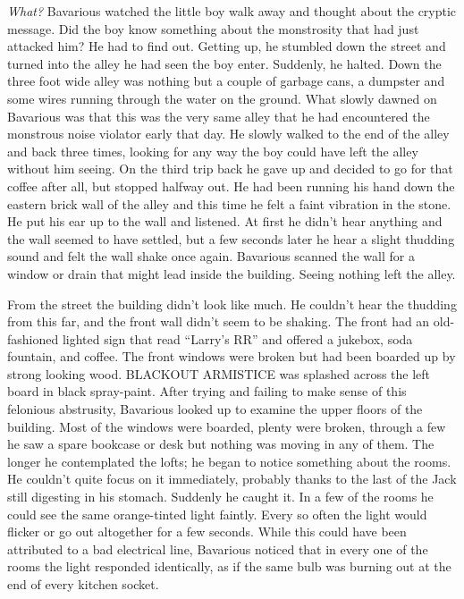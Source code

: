 {\em What?} Bavarious watched the little boy walk away and thought
about the cryptic message. Did the boy know something about the
monstrosity that had just attacked him? He had to find out. Getting
up, he stumbled down the street and turned into the alley he had
seen the boy enter. Suddenly, he halted. Down the three foot wide
alley was nothing but a couple of garbage cans, a dumpster and some
wires running through the water on the ground. What slowly dawned
on Bavarious was that this was the very same alley that he had
encountered the monstrous noise violator early that day. He slowly
walked to the end of the alley and back three times, looking for
any way the boy could have left the alley without him seeing. On
the third trip back he gave up and decided to go for that coffee
after all, but stopped halfway out. He had been running his hand
down the eastern brick wall of the alley and this time he felt a
faint vibration in the stone. He put his ear up to the wall and
listened. At first he didn't hear anything and the wall
seemed to have settled, but a few seconds later he hear a slight
thudding sound and felt the wall shake once again. Bavarious
scanned the wall for a window or drain that might lead inside the
building. Seeing nothing left the alley.



From the street the building didn't look like much. He
couldn't hear the thudding from this far, and the front wall
didn't seem to be shaking. The front had an old-fashioned
lighted sign that read ``Larry's RR'' and offered a
jukebox, soda fountain, and coffee. The front windows were broken
but had been boarded up by strong looking wood. BLACKOUT ARMISTICE
was splashed across the left board in black spray-paint. After
trying and failing to make sense of this felonious abstrusity,
Bavarious looked up to examine the upper floors of the building.
Most of the windows were boarded, plenty were broken, through a few
he saw a spare bookcase or desk but nothing was moving in any of
them. The longer he contemplated the lofts; he began to notice
something about the rooms. He couldn't quite focus on it
immediately, probably thanks to the last of the Jack still
digesting in his stomach. Suddenly he caught it. In a few of the
rooms he could see the same orange-tinted light faintly. Every so
often the light would flicker or go out altogether for a few
seconds. While this could have been attributed to a bad electrical
line, Bavarious noticed that in every one of the rooms the light
responded identically, as if the same bulb was burning out at the
end of every kitchen socket.



